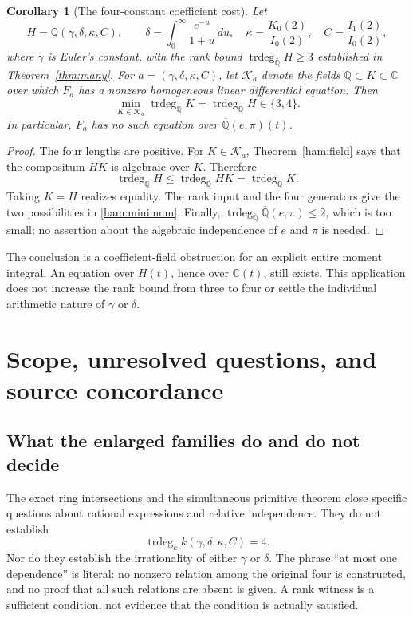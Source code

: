 \documentclass[11pt]{article}
\newtheorem{corollary}[theorem]{Corollary}
\theoremstyle{definition}
\theoremstyle{remark}
\newcommand{\Qa}{\overline{\mathbb Q}}
\newcommand{\trdeg}{\operatorname{trdeg}}
\begin{document}
\begin{corollary}[The four-constant coefficient cost]\label{ham:application}
Let
\[
 H=\Qa(\gamma,\delta,\kappa,C),\qquad
 \delta=\int_0^\infty\frac{e^{-u}}{1+u}\,du,\quad
 \kappa=\frac{K_0(2)}{I_0(2)},\quad C=\frac{I_1(2)}{I_0(2)},
\]
where $\gamma$ is Euler's constant, with the rank bound
$\trdeg_{\Qa}H\ge3$ established in Theorem~\ref{thm:many}.
For $a=(\gamma,\delta,\kappa,C)$, let $\mathcal K_a$ denote the fields
$\Qa\subset K\subset\mathbb C$ over which $F_a$ has a nonzero homogeneous
linear differential equation.  Then
\begin{equation}\label{ham:minimum}
 \min_{K\in\mathcal K_a}\trdeg_{\Qa}K
   =\trdeg_{\Qa}H\in\{3,4\}.
\end{equation}
In particular, $F_a$ has no such equation over $\Qa(e,\pi)(t)$.
\end{corollary}
\begin{proof}
The four lengths are positive.  For $K\in\mathcal K_a$,
Theorem~\ref{ham:field} says that the compositum $HK$ is algebraic over
$K$.  Therefore
\[
 \trdeg_{\Qa}H\le\trdeg_{\Qa}HK=\trdeg_{\Qa}K.
\]
Taking $K=H$ realizes equality.  The rank input and the four generators
give the two possibilities in \eqref{ham:minimum}.  Finally,
$\trdeg_{\Qa}\Qa(e,\pi)\le2$, which is too small; no assertion about
the algebraic independence of $e$ and $\pi$ is needed.
\end{proof}

The conclusion is a coefficient-field obstruction for an explicit
entire moment integral.  An equation over $H(t)$, hence over
$\mathbb C(t)$, still exists.  This application does not increase the
rank bound from three to four or settle the individual arithmetic
nature of $\gamma$ or $\delta$.

\section{Scope, unresolved questions, and source concordance}
\label{sec:scope}
\subsection{What the enlarged families do and do not decide}
The exact ring intersections and the simultaneous primitive theorem
close specific questions about rational expressions and relative
independence. They do not establish
\[
 \trdeg_k k(\gamma,\delta,\kappa,C)=4.
\]
Nor do they establish the irrationality of either $\gamma$ or $\delta$.
The phrase ``at most one dependence'' is literal: no nonzero relation
among the original four is constructed, and no proof that all such
relations are absent is given. A rank witness is a sufficient condition,
not evidence that the condition is actually satisfied.
\end{document}
